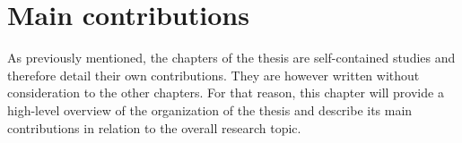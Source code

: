 

\chapter[main contribution]{Main contributions}\label{chp:main-contributions}

As previously mentioned, the chapters of the thesis are self-contained studies and therefore detail their own contributions. 
They are however written without consideration to the other chapters. 
For that reason, this chapter will provide a high-level overview of the organization of the thesis and describe its main
contributions in relation to the overall research topic.



